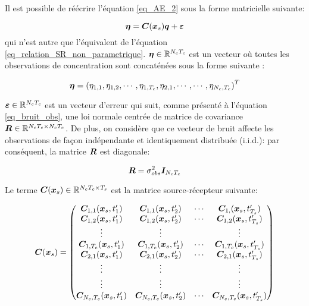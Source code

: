 Il est possible de réécrire l'équation \eqref{eq_AE_2} sous la forme matricielle suivante:

\begin{equation}
{\bm{\eta}} = {\bm{C}}({\bm{x}_s}){\bm{q}} + {\bm{\varepsilon}}
\label{eq_AE_3}
\end{equation}
qui n'est autre que l'équivalent de l'équation \eqref{eq_relation_SR_non_parametrique}. ${\bm{\eta}} \in \mathbb{R}^{N_cT_c}$ est un vecteur où toutes les observations de concentration sont concaténées sous la forme suivante : 

\begin{equation}
{\bm{\eta}} = \left({\eta}_{1,1}, {\eta}_{1,2}, \cdots, {\eta}_{1,T_c}, {\eta}_{2,1}, \cdots, \cdots, {\eta}_{N_c,T_c}\right)^T
\label{eq_AE_3_plus}
\end{equation}

${\bm{\varepsilon}} \in \mathbb{R}^{N_cT_c}$ est un vecteur d'erreur qui suit, comme présenté à l'équation \eqref{eq_bruit_obs}, une loi normale centrée de matrice de covariance ${\bm{R}} \in \mathbb{R}^{N_cT_c \times N_cT_c}$. De plus, on considère que ce vecteur de bruit affecte les observations de façon indépendante et identiquement distribuée (i.i.d.): par conséquent, la matrice ${\bm{R}}$ est diagonale: 


\begin{equation}
	{
		{\bm{R}}= {\sigma_{obs}^2}{\bm{I}}_{N_c T_c}
		}
\end{equation}

Le terme ${\bm{C}}({\bm{x}_s}) \in \mathbb{R}^{N_cT_c \times T_s}$ est la matrice source-récepteur suivante:

\begin{equation}
{\bm{C}}({\bm{x}_s}) = 
\begin{pmatrix}
{\bm{C}}_{1,1}({\bm{x}_s}, t'_1) & {\bm{C}}_{1,1}({\bm{x}_s}, t'_2)  & \cdots & {\bm{C}}_{1,}({\bm{x}_s}, t'_{T_s}) \\ 
{\bm{C}}_{1,2}({\bm{x}_s}, t'_1) & {\bm{C}}_{1,2}({\bm{x}_s}, t'_2)  & \cdots & {\bm{C}}_{1,2}({\bm{x}_s}, t'_{T_s}) \\
\vdots & \vdots &  & \vdots \\
{\bm{C}}_{1,T_c}({\bm{x}_s}, t'_1) & {\bm{C}}_{1,T_c}({\bm{x}_s}, t'_2)  & \cdots & {\bm{C}}_{1,T_c}({\bm{x}_s}, t'_{T_s}) \\
{\bm{C}}_{2,1}({\bm{x}_s}, t'_1) & {\bm{C}}_{2,1}({\bm{x}_s}, t'_2)  & \cdots & {\bm{C}}_{2,1}({\bm{x}_s}, t'_{T_s}) \\
\vdots & \vdots &  & \vdots \\
\vdots & \vdots &  & \vdots \\
{\bm{C}}_{N_c,T_c}({\bm{x}_s},  t'_1) & {\bm{C}}_{N_c,T_c}({\bm{x}_s},  t'_2)  & \cdots & {\bm{C}}_{N_c,T_c}({\bm{x}_s},  t'_{T_s}) \\
\end{pmatrix}
\label{eq_AE_4}
\end{equation}

